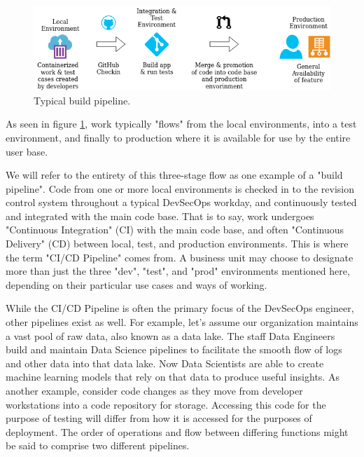 \begin{figure}
	\centering
	\includegraphics[scale=0.63]{../images/flow.png}
	\caption{Typical build pipeline.}
	\label{fig:pipeline}
\end{figure}

\justify
As seen in figure \ref{fig:pipeline}, work typically "flows" from the
local environments, into a test environment, and finally to production
where it is available for use by the entire user base.

\justify
We will refer to the entirety of this three-stage flow as one example of
a "build pipeline". Code from one or more local
environments is checked in to the revision control system throughout a
typical DevSecOps workday, and continuously tested and integrated with
the main code base. That is to say, work undergoes "Continuous Integration"
(CI) with the main code base,
and often "Continuous Delivery" (CD)
between local, test, and production environments. This is where the term
"CI/CD Pipeline" comes from. A business unit may choose to designate more
than just the three "dev", "test", and "prod" environments mentioned here,
depending on their particular use cases and ways of working.

\justify
While the CI/CD Pipeline is often the primary focus of the DevSecOps
engineer, other pipelines exist as well. For example, let's assume our
organization maintains a vast pool of raw data, also known as a data
lake. The staff Data Engineers build and maintain
Data Science pipelines to facilitate the smooth flow
of logs and other data into that data lake. Now Data Scientists are able
to create machine learning models that rely on that data to produce useful
insights. As another example, consider code changes as they move from
developer workstations into a code repository for storage. Accessing
this code for the purpose of testing will differ from how it is accessed
for the purposes of deployment. The order of operations and flow
between differing functions might be said to comprise two different pipelines.

